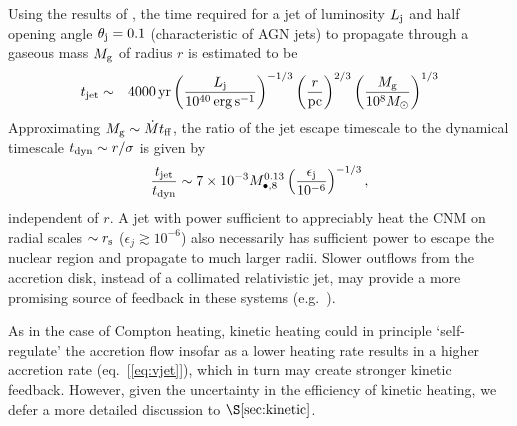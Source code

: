 \documentclass[usenatbib,fleqn]{mn2e}
\begin{document}
Using the results of \citet{Bromberg+11}, the time required for a jet of luminosity $L_{\rm
  j}$ and half opening angle $\theta_{\rm j} = 0.1$ (characteristic of
AGN jets) to propagate through a gaseous mass $M_{\rm g}$ of radius $r$ is estimated to be
\begin{eqnarray}
t_{\rm jet} &\sim& 4000\,{\rm yr}\left(\frac{{L}_{\rm j}}{10^{40}\,\rm erg\,s^{-1}}\right)^{-1/3}\left(\frac{r}{\rm pc}\right)^{2/3}\left(\frac{M_{\rm g}}{10^{8}M_{\odot}}\right)^{1/3} 
\end{eqnarray}
Approximating $M_{\rm g} \sim \dot{M}t_{\rm ff}$, the ratio of the jet escape timescale to the dynamical timescale $t_{\rm dyn} \sim r/\sigma$ is given by
\begin{equation}
\frac{t_{\rm jet}}{t_{\rm dyn}} \sim 7\times 10^{-3}M_{\bullet,8}^{0.13}\left(\frac{\epsilon_{\rm j}}{10^{-6}}\right)^{-1/3},
\end{equation}
independent of $r$.  A jet with power sufficient to appreciably heat
the CNM on radial scales $\sim r_{\rm s}$ ($\epsilon_{j} \gtrsim
10^{-6}$) also necessarily has sufficient power to escape the nuclear
region and propagate to much larger radii.  Slower outflows from the
accretion disk, instead of a collimated relativistic jet, may provide
a more promising source of feedback in these systems
(e.g.~\citealt{Li+13}).

As in the case of Compton heating, kinetic heating could in principle
`self-regulate' the accretion flow insofar as a lower heating rate
results in a higher accretion rate (eq.~[\ref{eq:vjet}]), which in
turn may create stronger kinetic feedback.  However, given the uncertainty
in the efficiency of kinetic heating, we defer a more detailed discussion
to $\S\ref{sec:kinetic}$.
\end{document}
